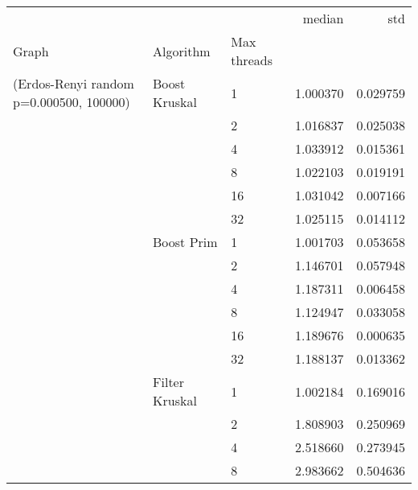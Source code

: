 \begin{tabular}{lllrr}
\toprule
                                                       &                     &    &    median &       std \\
Graph & Algorithm & Max threads &           &           \\
\midrule
(Erdos-Renyi random p=0.000500, 100000) & Boost Kruskal & 1  &  1.000370 &  0.029759 \\
                                                       &                     & 2  &  1.016837 &  0.025038 \\
                                                       &                     & 4  &  1.033912 &  0.015361 \\
                                                       &                     & 8  &  1.022103 &  0.019191 \\
                                                       &                     & 16 &  1.031042 &  0.007166 \\
                                                       &                     & 32 &  1.025115 &  0.014112 \\
                                                       & Boost Prim & 1  &  1.001703 &  0.053658 \\
                                                       &                     & 2  &  1.146701 &  0.057948 \\
                                                       &                     & 4  &  1.187311 &  0.006458 \\
                                                       &                     & 8  &  1.124947 &  0.033058 \\
                                                       &                     & 16 &  1.189676 &  0.000635 \\
                                                       &                     & 32 &  1.188137 &  0.013362 \\
                                                       & Filter Kruskal & 1  &  1.002184 &  0.169016 \\
                                                       &                     & 2  &  1.808903 &  0.250969 \\
                                                       &                     & 4  &  2.518660 &  0.273945 \\
                                                       &                     & 8  &  2.983662 &  0.504636 \\

\end{tabular}
